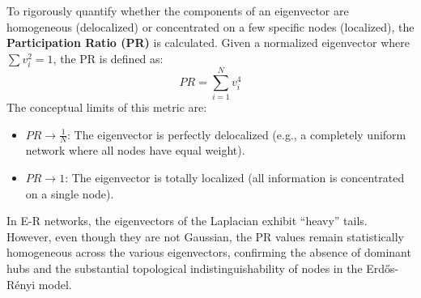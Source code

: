 \begin{remark}
    To rigorously quantify whether the components of an eigenvector are homogeneous (delocalized) or concentrated on a few specific nodes (localized), the \textbf{Participation Ratio (PR)} is calculated.
    Given a normalized eigenvector where \( \sum v_i^2 = 1 \), the PR is defined as:
    \[ PR = \sum_{i=1}^N v_i^4 \]
    The conceptual limits of this metric are:
    \begin{itemize}
        \item \( PR \to \frac{1}{N} \): The eigenvector is perfectly delocalized (e.g., a completely uniform network where all nodes have equal weight).
        \item \( PR \to 1 \): The eigenvector is totally localized (all information is concentrated on a single node).
    \end{itemize}
    In E-R networks, the eigenvectors of the Laplacian exhibit ``heavy'' tails. However, even though they are not Gaussian, the PR values remain statistically homogeneous across the various eigenvectors, confirming the absence of dominant hubs and the substantial topological indistinguishability of nodes in the Erdős-Rényi model.
\end{remark}